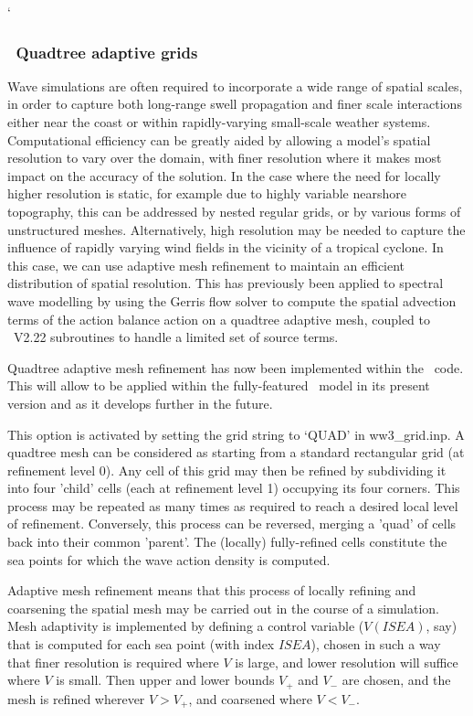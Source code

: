         `\vssub
\subsubsection{~Quadtree adaptive grids} \label{sub:num_space_qa}

\noindent 
Wave simulations are often required to incorporate a wide range of spatial 
scales, in order to capture both long-range swell propagation and finer scale 
interactions either near the coast or within rapidly-varying small-scale 
weather systems.
Computational efficiency can be greatly aided by allowing a model's spatial 
resolution to vary over the domain, with finer resolution where it makes most 
impact on the accuracy of the solution.
In the case where the need for locally higher resolution is static,
for example due to highly variable nearshore topography, this can be addressed 
by nested regular grids, or by various forms of unstructured meshes.
Alternatively, high resolution may be needed to capture the influence of
rapidly varying wind fields in the vicinity of a tropical cyclone.
In this case, we can use adaptive mesh refinement to maintain an efficient 
distribution of spatial resolution.
This has previously been applied to spectral wave modelling 
\citep{art:PGRT10xx} 
by using the Gerris flow solver \citep{art:PopinetXX} to compute the spatial 
advection terms of the action balance action on a quadtree adaptive mesh, 
coupled to \ws\ V2.22 subroutines to handle a limited set of source terms.

Quadtree adaptive mesh refinement has now been implemented within the \ws\ 
code. This will allow to be applied within the fully-featured \ws\ model 
in its present version and as it develops further in the future.

This option is activated by setting the grid string to `{\code QUAD}' in 
{\file ww3\_grid.inp}. A quadtree mesh can be considered as starting from
a standard rectangular grid (at refinement level 0). Any cell of this grid 
may then be refined by subdividing it into four 'child' cells (each at 
refinement level 1) occupying its four corners. 
This process may be repeated as many times as required to reach a desired 
local level of refinement. 
Conversely, this process can be reversed, merging a 'quad' of cells back 
into their common 'parent'. The (locally) fully-refined cells constitute 
the sea points for which the wave action density is computed.

Adaptive mesh refinement means that this process of locally refining and 
coarsening the spatial mesh may be carried out in the course of a simulation. 
Mesh adaptivity is implemented by defining a control variable 
($V(ISEA)$, say) that is computed for each sea point (with 
index $ISEA$), chosen in such a way that finer resolution is required 
where $V$ is large, and lower resolution will suffice where $V$ is small. 
Then upper and lower bounds $V_+$ and $V_-$ are chosen, and the mesh is 
refined wherever $V>V_+$, and coarsened where $V<V_-$.

